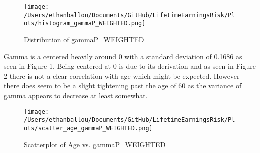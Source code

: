 \documentclass[12pt]{article}
\begin{document}
\begin{onehalfspace}
\begin{figure}[H]
    \centering
    \texttt{[image: /Users/ethanballou/Documents/GitHub/LifetimeEarningsRisk/Plots/histogram\_gammaP\_WEIGHTED.png]}
    \caption{Distribution of gammaP\_WEIGHTED}
\end{figure}




Gamma is a centered heavily around 0 with a standard deviation of 0.1686 as seen in Figure 1. Being centered at 0 is due to its derivation and as seen in Figure 2 there is not a clear correlation with age which might be expected. However there does seem to be a slight tightening past the age of 60 as the variance of gamma appears to decrease at least somewhat.






\begin{figure}[H]
    \centering
    \texttt{[image: /Users/ethanballou/Documents/GitHub/LifetimeEarningsRisk/Plots/scatter\_age\_gammaP\_WEIGHTED.png]}
    \caption{Scatterplot of Age vs. gammaP\_WEIGHTED}
\end{figure}


\end{onehalfspace}
\end{document}
